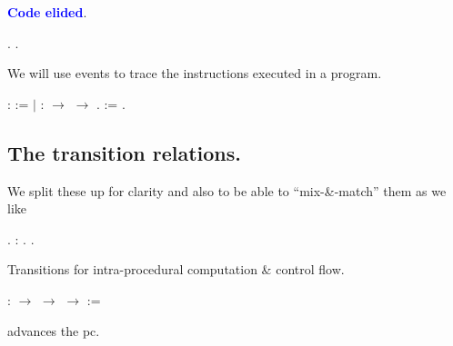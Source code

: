 \documentclass[12pt]{report}
\begin{document}
      \textcolor{blue}{\textbf{Code elided}}.


      
\begin{coqdoccode}
\coqdocemptyline
\coqdocindent{1.00em}
 .\coqdoceol
\coqdocindent{1.00em}
     .\coqdoceol
\coqdocemptyline
\end{coqdoccode}
We will use events to trace the instructions executed
      in a program.


       
\begin{coqdoccode}
\coqdocindent{1.00em}
  :  :=\coqdoceol
\coqdocindent{2.00em}
\ensuremath{|} :  \ensuremath{\rightarrow}  \ensuremath{\rightarrow} .\coqdoceol
\coqdocindent{1.00em}
  :=  .\coqdoceol
\coqdocemptyline
\end{coqdoccode}
\subsection{The transition relations.}


        We split these up for clarity and also to be able
        to ``mix-\&-match'' them as we like


        
\begin{coqdoccode}
\coqdocemptyline
\coqdocindent{1.00em}
 .\coqdoceol
\coqdocindent{2.00em}
 : .\coqdoceol
\coqdocindent{2.00em}
  .\coqdoceol
\coqdocemptyline
\coqdocemptyline
\end{coqdoccode}
Transitions for intra-procedural computation \& control flow.


     
\begin{coqdoccode}
\coqdocindent{2.00em}
  :  \ensuremath{\rightarrow}  \ensuremath{\rightarrow}  \ensuremath{\rightarrow}  :=\coqdoceol
\coqdocnoindent
\coqdoceol
\coqdocindent{3.00em}
\end{coqdoccode}
 advances the pc.
\end{document}
